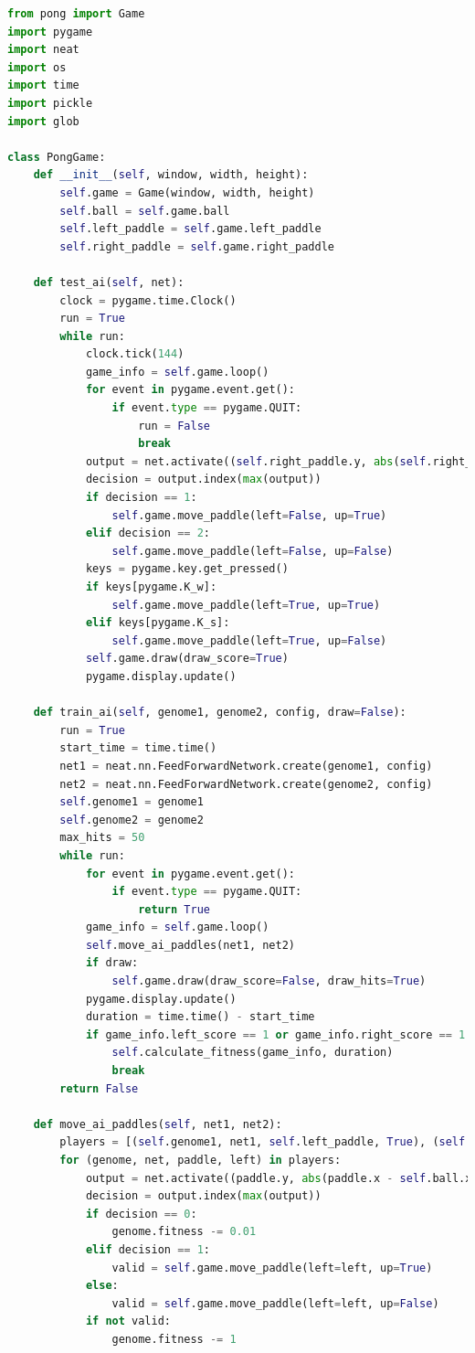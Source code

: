 \documentclass[10pt]{article}
\begin{document}
\begin{lstlisting}[language=Python, caption=main.py code]
from pong import Game
import pygame
import neat
import os
import time
import pickle
import glob

class PongGame:
    def __init__(self, window, width, height):
        self.game = Game(window, width, height)
        self.ball = self.game.ball
        self.left_paddle = self.game.left_paddle
        self.right_paddle = self.game.right_paddle

    def test_ai(self, net):
        clock = pygame.time.Clock()
        run = True
        while run:
            clock.tick(144)
            game_info = self.game.loop()
            for event in pygame.event.get():
                if event.type == pygame.QUIT:
                    run = False
                    break
            output = net.activate((self.right_paddle.y, abs(self.right_paddle.x - self.ball.x), self.ball.y))
            decision = output.index(max(output))
            if decision == 1:
                self.game.move_paddle(left=False, up=True)
            elif decision == 2:
                self.game.move_paddle(left=False, up=False)
            keys = pygame.key.get_pressed()
            if keys[pygame.K_w]:
                self.game.move_paddle(left=True, up=True)
            elif keys[pygame.K_s]:
                self.game.move_paddle(left=True, up=False)
            self.game.draw(draw_score=True)
            pygame.display.update()

    def train_ai(self, genome1, genome2, config, draw=False):
        run = True
        start_time = time.time()
        net1 = neat.nn.FeedForwardNetwork.create(genome1, config)
        net2 = neat.nn.FeedForwardNetwork.create(genome2, config)
        self.genome1 = genome1
        self.genome2 = genome2
        max_hits = 50
        while run:
            for event in pygame.event.get():
                if event.type == pygame.QUIT:
                    return True
            game_info = self.game.loop()
            self.move_ai_paddles(net1, net2)
            if draw:
                self.game.draw(draw_score=False, draw_hits=True)
            pygame.display.update()
            duration = time.time() - start_time
            if game_info.left_score == 1 or game_info.right_score == 1 or game_info.left_hits >= max_hits:
                self.calculate_fitness(game_info, duration)
                break
        return False

    def move_ai_paddles(self, net1, net2):
        players = [(self.genome1, net1, self.left_paddle, True), (self.genome2, net2, self.right_paddle, False)]
        for (genome, net, paddle, left) in players:
            output = net.activate((paddle.y, abs(paddle.x - self.ball.x), self.ball.y))
            decision = output.index(max(output))
            if decision == 0:
                genome.fitness -= 0.01
            elif decision == 1:
                valid = self.game.move_paddle(left=left, up=True)
            else:
                valid = self.game.move_paddle(left=left, up=False)
            if not valid:
                genome.fitness -= 1


\end{lstlisting}
\end{document}
